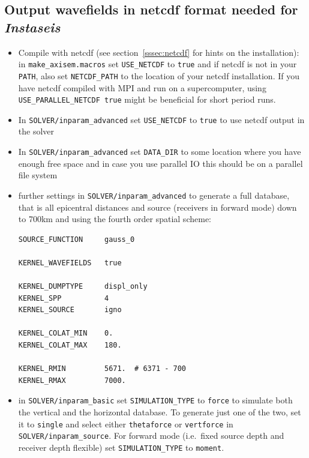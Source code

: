 \documentclass{article}
\begin{document}
\subsection{Output wavefields in netcdf format needed for \textit{Instaseis}}

\begin{itemize}
    \item Compile with netcdf (see section~\ref{sssec:netcdf} for hints on the
    installation): in \verb|make_axisem.macros| set \verb|USE_NETCDF| to \verb|true|
    and if netcdf is not in your \verb|PATH|, also set \verb|NETCDF_PATH| to the location
    of your netcdf installation. If you have netcdf compiled with MPI and run on a
    supercomputer, using \verb|USE_PARALLEL_NETCDF true| might be beneficial for short
    period runs.
    \item In \verb|SOLVER/inparam_advanced| set \verb|USE_NETCDF| to \verb|true| to
    use netcdf output in the solver
    \item In \verb|SOLVER/inparam_advanced| set \verb|DATA_DIR| to some location where you
    have enough free space and in case you use parallel IO this should be on a parallel
    file system
    \item further settings in \verb|SOLVER/inparam_advanced| to generate a full database,
    that is all epicentral distances and source (receivers in forward mode)
    down to 700km and using the fourth order spatial scheme:

\begin{verbatim}
SOURCE_FUNCTION     gauss_0

KERNEL_WAVEFIELDS   true

KERNEL_DUMPTYPE     displ_only
KERNEL_SPP          4
KERNEL_SOURCE       igno

KERNEL_COLAT_MIN    0.
KERNEL_COLAT_MAX    180.

KERNEL_RMIN         5671.  # 6371 - 700
KERNEL_RMAX         7000.
\end{verbatim}

    \item in \verb|SOLVER/inparam_basic| set \verb|SIMULATION_TYPE| to \verb|force| to
    simulate both the vertical and the horizontal database. To generate just one of the
    two, set it to \verb|single| and select either \verb|thetaforce| or \verb|vertforce|
    in \\\verb|SOLVER/inparam_source|. For forward mode (i.e.\ fixed source
    depth and receiver depth flexible) set \verb|SIMULATION_TYPE| to
    \verb|moment|.


\end{itemize}
\end{document}
